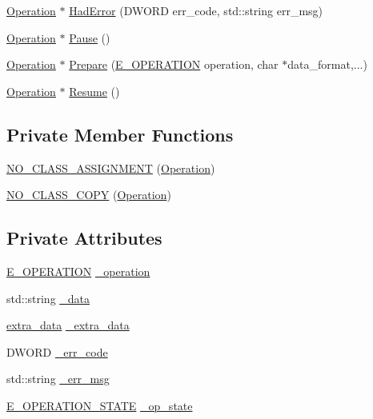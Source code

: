 \begin{DoxyCompactItemize}
\item 
\hyperlink{class_operation}{Operation} $\ast$ \hyperlink{class_operation_adbb06f3fb4fba2213530e1d544731165}{Had\-Error} (D\-W\-O\-R\-D err\-\_\-code, std\-::string err\-\_\-msg)
\item 
\hyperlink{class_operation}{Operation} $\ast$ \hyperlink{class_operation_ad72a4baf1246a151c3a96ee50f7ea4f7}{Pause} ()
\item 
\hyperlink{class_operation}{Operation} $\ast$ \hyperlink{class_operation_a9cf09be1677eb47538ace38ceb8d3fcb}{Prepare} (\hyperlink{_operation_8h_a29c331c24eda38b81f1e27a40391a589}{E\-\_\-\-O\-P\-E\-R\-A\-T\-I\-O\-N} operation, char $\ast$data\-\_\-format,...)
\item 
\hyperlink{class_operation}{Operation} $\ast$ \hyperlink{class_operation_ab8c5e5b425314aacb2c9ff4bbc4aead3}{Resume} ()
\end{DoxyCompactItemize}
\subsection*{Private Member Functions}
\begin{DoxyCompactItemize}
\item 
\hyperlink{class_operation_a944923ea5cc5043cb6223da880d7bfcc}{N\-O\-\_\-\-C\-L\-A\-S\-S\-\_\-\-A\-S\-S\-I\-G\-N\-M\-E\-N\-T} (\hyperlink{class_operation}{Operation})
\item 
\hyperlink{class_operation_a3628710ccd25dcc0fbd628d5234bd874}{N\-O\-\_\-\-C\-L\-A\-S\-S\-\_\-\-C\-O\-P\-Y} (\hyperlink{class_operation}{Operation})
\end{DoxyCompactItemize}
\subsection*{Private Attributes}
\begin{DoxyCompactItemize}
\item 
\hyperlink{_operation_8h_a29c331c24eda38b81f1e27a40391a589}{E\-\_\-\-O\-P\-E\-R\-A\-T\-I\-O\-N} \hyperlink{class_operation_ad78d85f09c55913fe1f82a0f77a0dc8c}{\-\_\-operation}
\item 
std\-::string \hyperlink{class_operation_a383d54b86fa3d166b491bcc82d1ce266}{\-\_\-data}
\item 
\hyperlink{structextra__data}{extra\-\_\-data} \hyperlink{class_operation_a1e970bd91884353e9bcb147ca27ecfa0}{\-\_\-extra\-\_\-data}
\item 
D\-W\-O\-R\-D \hyperlink{class_operation_a64908392b807de489bf0913eab33f859}{\-\_\-err\-\_\-code}
\item 
std\-::string \hyperlink{class_operation_aa1233375b7028c9870788468b8adf749}{\-\_\-err\-\_\-msg}
\item 
\hyperlink{_operation_8h_ac3f77f49db5f357de93e5a22bc2f601f}{E\-\_\-\-O\-P\-E\-R\-A\-T\-I\-O\-N\-\_\-\-S\-T\-A\-T\-E} \hyperlink{class_operation_afcd7896bcf67fa412e1af85cbb6d6b6b}{\-\_\-op\-\_\-state}
\end{DoxyCompactItemize}


